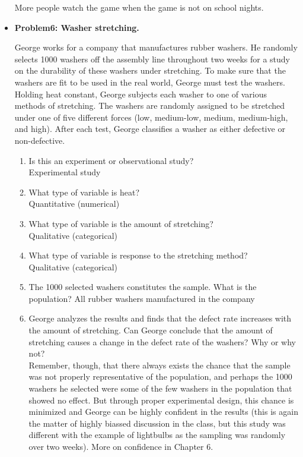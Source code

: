 \documentclass[11pt]{article}\usepackage[]{graphicx}\usepackage[]{color}
\newcommand{\ben}{\begin{enumerate}}
\newcommand{\een}{\end{enumerate}}
\begin{document}
\begin{itemize}
More people watch the game when the game is not on school nights. 
\item \textbf{Problem6: Washer stretching.}
  
George works for a company that manufactures 
rubber washers.  He randomly selects 1000 
washers off the assembly line throughout two weeks
for a study on the durability of these washers under  
stretching.  To make sure that the washers 
are fit to be used in the real world, George must test 
the washers.  Holding heat constant, 
George subjects each washer to one of various methods of 
stretching.  The washers are randomly assigned to be stretched under one of five different forces (low, medium-low, medium, medium-high, and high).
After each test, George classifies 
a washer as either defective or non-defective. 
 
\ben 
\item Is this an experiment or observational study? \\
Experimental study
\item What type of variable is heat? \\
Quantitative (numerical)
 
\item What type of variable is the amount of stretching? \\
Qualitative (categorical)
 
\item What type of variable is response to the stretching method?\\
Qualitative  (categorical)
 
\item
The 1000 selected washers constitutes the sample. What is the population? 
All rubber washers manufactured in the company

\item George analyzes the results and finds that the defect rate
increases with the amount of stretching.
Can George conclude that the amount of stretching 
causes a change in the defect rate of the washers?
Why or why not?\\


Remember, though, that there always exists the chance that the sample
was not properly representative of the population, and perhaps 
the 1000 washers he selected 
were some of the few washers in the population
that showed no effect. 
But through proper
experimental design, this chance is minimized and George can 
be highly confident in the results (this is again the matter of highly biassed discussion in the class, but this study was different with the example of lightbulbs as the sampling was randomly over two weeks). More on confidence in Chapter 6.
\een


\end{itemize}
\end{document}
